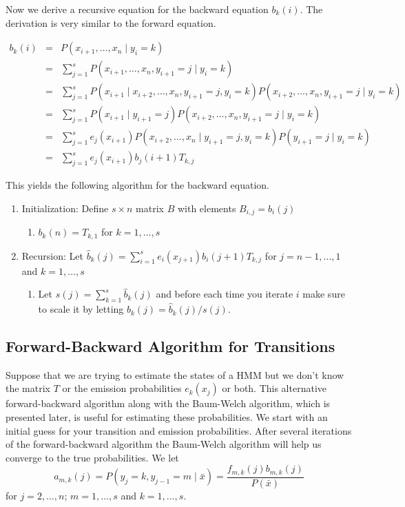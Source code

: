 \documentclass{article}
\numberwithin{equation}{section}
\renewcommand{\P}{P}
\begin{document}
Now we derive a recursive equation for the backward equation
$b_k(i)$.  The derivation is very similar to the forward equation.

\begin{eqnarray*}
b_k(i) &=& \P(x_{i+1},\ldots,x_n\mid y_i=k) \\
&=& \sum_{j=1}^s \P(x_{i+1},\ldots,x_n,y_{i+1}=j \mid y_i=k) \\
&=& \sum_{j=1}^s \P(x_{i+1}\mid
x_{i+2},\ldots,x_n,y_{i+1}=j,y_i=k)\P(x_{i+2},\ldots,x_n,y_{i+1}=j\mid
y_i=k) \\
&=& \sum_{j=1}^s \P(x_{i+1}\mid
y_{i+1}=j)\P(x_{i+2},\ldots,x_n,y_{i+1}=j\mid y_i=k) \\
&=& \sum_{j=1}^s e_j(x_{i+1})\P(x_{i+2},\ldots,x_n\mid y_{i+1}=j,y_i=k)\P(y_{i+1}=j\mid y_i=k) \\
&=& \sum_{j=1}^s e_j(x_{i+1})b_j(i+1)T_{k,j}
\end{eqnarray*}

This yields the following algorithm for the backward equation.

\begin{enumerate}
\item Initialization:  Define $s\times n$ matrix $B$ with elements
$B_{i,j}=b_i(j)$
    \begin{enumerate}
    \item $b_k(n)=T_{k,1}$ for $k=1,\ldots,s$
    \end{enumerate}
\item Recursion: Let $\hat{b}_k(j)=\sum_{i=1}^s e_i(x_{j+1})b_i(j+1)T_{k,j}$ for $j=n-1,\ldots,1$ and $k=1,\ldots,s$
    \begin{enumerate}
    \item Let $s(j)=\sum_{k=1}^s \hat{b}_k(j)$ and before each time you
    iterate $i$ make sure to scale it by letting
    $b_k(j)=\hat{b}_k(j)/s(j)$.
    \end{enumerate}
\end{enumerate}

\subsection{Forward-Backward Algorithm for Transitions}

Suppose that we are trying to estimate the states of a HMM but we
don't know the matrix $T$ or the emission probabilities $e_k(x_j)$
or both. This alternative forward-backward algorithm along with the
Baum-Welch algorithm, which is presented later, is useful for
estimating these probabilities.  We start with an initial guess for
your transition and emission probabilities.  After several
iterations of the forward-backward algorithm the Baum-Welch
algorithm will help us converge to the true probabilities. We let
\[
a_{m,k}(j)=\P(y_j=k,y_{j-1}=m\mid
\bar{x})=\frac{f_{m,k}(j)b_{m,k}(j)}{\P(\bar{x})}
\]
for $j=2,\ldots,n$; $m=1,\ldots,s$ and $k=1,\ldots,s$.
\end{document}
